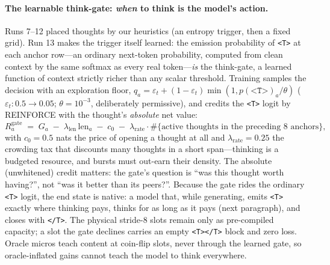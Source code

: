 \documentclass{article} %
\newcommand{\gain}{G}
\newcommand{\tstart}{\texttt{<T>}}
\newcommand{\tend}{\texttt{</T>}}
\begin{document}
\paragraph{The learnable think-gate: \emph{when} to think is the model's action.} Runs 7--12 placed thoughts by our heuristics (an entropy trigger, then a fixed grid). Run 13 makes the trigger itself learned: the emission probability of \tstart{} at each anchor row---an ordinary next-token probability, computed from clean context by the same softmax as every real token---\emph{is} the think-gate, a learned function of context strictly richer than any scalar threshold. Training samples the decision with an exploration floor, $q_a = \varepsilon_t + (1-\varepsilon_t)\min(1, p(\tstart)_a/\theta)$ ($\varepsilon_t: 0.5 \to 0.05$; $\theta = 10^{-3}$, deliberately permissive), and credits the \tstart{} logit by REINFORCE with the thought's \emph{absolute} net value:
\[ R^{\mathrm{gate}}_a \;=\; \gain_a \;-\; \lambda_{\mathrm{len}}\,\mathrm{len}_a \;-\; c_0 \;-\; \lambda_{\mathrm{rate}}\cdot\#\{\text{active thoughts in the preceding 8 anchors}\}, \]
with $c_0{=}0.5$ nats the price of opening a thought at all and $\lambda_{\mathrm{rate}}{=}0.25$ the crowding tax that discounts many thoughts in a short span---thinking is a budgeted resource, and bursts must out-earn their density. The absolute (unwhitened) credit matters: the gate's question is ``was this thought worth having?'', not ``was it better than its peers?''. Because the gate rides the ordinary \tstart{} logit, the end state is native: a model that, while generating, emits \tstart{} exactly where thinking pays, thinks for as long as it pays (next paragraph), and closes with \tend. The physical stride-8 slots remain only as pre-compiled capacity; a slot the gate declines carries an empty \tstart\tend{} block and zero loss. Oracle micros teach content at coin-flip slots, never through the learned gate, so oracle-inflated gains cannot teach the model to think everywhere.
\end{document}
